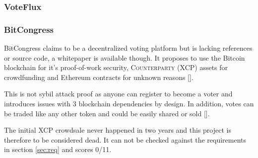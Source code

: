 \subsubsection{VoteFlux}

\subsubsection{BitCongress}
BitCongress claims to be a decentralized voting platform but is lacking references or source code, a whitepaper is available though. It proposes to use the Bitcoin blockchain for it's proof-of-work security, \textsc{Counterparty (XCP)} assets for crowdfunding and Ethereum contracts for unknown reasons [\cite{ROCKWELL2014}].\par
This is not sybil attack proof as anyone can register to become a voter and introduces issues with 3 blockchain dependencies by design. In addition, votes can be traded like any other token and could be easily shared or sold [\cite{VARSHNEYA2015}].\par
The initial XCP crowdsale never happened in two years and this project is therefore to be considered dead. It can not be checked against the requirements in section \ref{sec:req} and scores 0/11.

